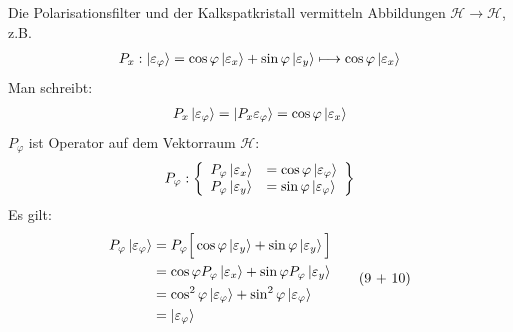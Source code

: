 \documentclass[a4paper]{scrartcl}
\begin{document}
{Die Polarisationsfilter und der Kalkspatkristall vermitteln Abbildungen $\mathcal H \longrightarrow \mathcal H$, z.B.
\begin{align}
P_x: \Ket{ \varepsilon_\varphi } = \cos \varphi \Ket{ \varepsilon_x } + \sin \varphi \Ket{ \varepsilon_y } \longmapsto \cos \varphi \Ket{ \varepsilon_x }
\end{align}
Man schreibt:
\begin{align}
P_x \Ket{\varepsilon_\varphi } = \Ket{ P_x \varepsilon_\varphi} = \cos \varphi \Ket{ \varepsilon_x }
\end{align}
$P_\varphi$ ist Operator auf dem Vektorraum $\mathcal H$:
\begin{align}
P_\varphi: 
\left\{ 
\begin{array}{l l}
P_\varphi \Ket{\varepsilon_x } & = \cos \varphi \Ket{\varepsilon_\varphi} \\
P_\varphi \Ket{\varepsilon_y } & = \sin \varphi \Ket{\varepsilon_\varphi} 
\end{array}
\right\}
\end{align}
Es gilt:
\begin{align}
\begin{split}
P_\varphi \Ket{ \varepsilon_\varphi} & = P_\varphi \Big[ \cos \varphi \Ket{ \varepsilon_y } + \sin \varphi \Ket{ \varepsilon_y } \Big]  \\
& =  \cos \varphi P_\varphi \Ket{ \varepsilon_x } + \sin \varphi P_\varphi \Ket{ \varepsilon_y }  \\
& = \cos^2\varphi \Ket{\varepsilon_\varphi } + \sin^2 \varphi \Ket{ \varepsilon_\varphi }  \\
& = \Ket{ \varepsilon_\varphi } 
\end{split} \tag{9 + 10} 
\end{align}

\setcounter{equation}{10}
}
\end{document}
